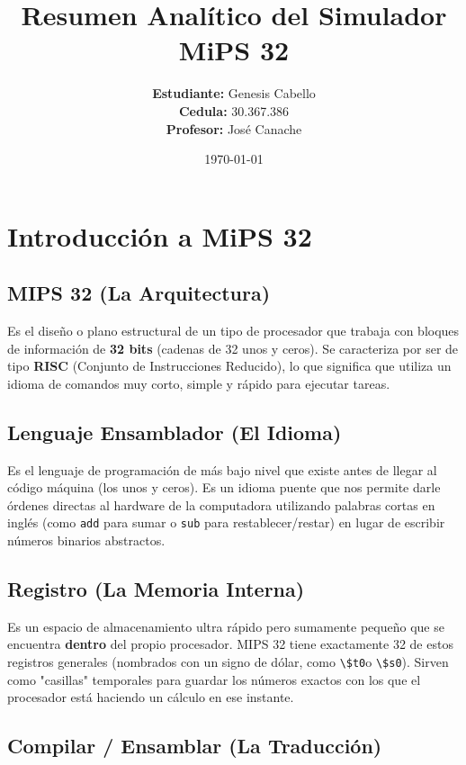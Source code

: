 \documentclass[12pt,a4paper]{article}
\title{\textbf{Resumen Analítico del Simulador MiPS 32}}
\author{\textbf{Estudiante:} Genesis Cabello\\\textbf{Cedula:} 30.367.386\\ \textbf{Profesor:} José Canache}
\date{\today} %
\begin{document}
\maketitle %
\newpage   %

\section{Introducción a MiPS 32}

\subsection{MIPS 32 (La Arquitectura)}

Es el diseño o plano estructural de un tipo de procesador que trabaja con bloques de información de \textbf{32 bits} (cadenas de 32 unos y ceros). Se caracteriza por ser de tipo \textbf{RISC} (Conjunto de Instrucciones Reducido), lo que significa que utiliza un idioma de comandos muy corto, simple y rápido para ejecutar tareas.

\subsection{Lenguaje Ensamblador (El Idioma)}

Es el lenguaje de programación de más bajo nivel que existe antes de llegar al código máquina (los unos y ceros). Es un idioma puente que nos permite darle órdenes directas al hardware de la computadora utilizando palabras cortas en inglés (como \verb|add| para sumar o \verb|sub| para restablecer/restar) en lugar de escribir números binarios abstractos.

\subsection{Registro (La Memoria Interna)}

Es un espacio de almacenamiento ultra rápido pero sumamente pequeño que se encuentra \textbf{dentro} del propio procesador. MIPS 32 tiene exactamente 32 de estos registros generales (nombrados con un signo de dólar, como \verb|\$t0|o \verb|\$s0|). Sirven como "casillas" temporales para guardar los números exactos con los que el procesador está haciendo un cálculo en ese instante.

\subsection{Compilar / Ensamblar (La Traducción)}
\end{document}
